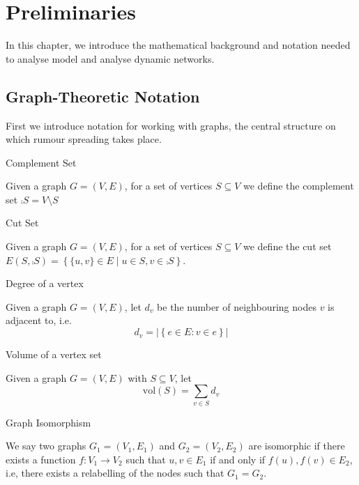 \chapter{Preliminaries}
\label{chapter:Prelims}

In this chapter, we introduce the mathematical background and notation needed to analyse model and analyse dynamic networks.

\section{Graph-Theoretic Notation}\label{section:graphNotation}

First we introduce notation for working with graphs, the central structure on which rumour spreading takes place.

\begin{definition}
	Complement Set

	\noindent
	Given a graph $G = (V, E)$, for a set of vertices $S \subseteq V$ we define the complement set $\comp{S} = V \setminus S$
\end{definition}

\begin{definition}
	Cut Set

	\noindent
	Given a graph $G = (V, E)$, for a set of vertices $S \subseteq V$ we define the cut set $ E(S, \comp{S}) = \left\{\{u, v\} \in E \mid u \in S, v \in \comp{S} \right\}.$
\end{definition}

\begin{definition}
	Degree of a vertex

	\noindent
	Given a graph $G = (V, E)$, let $d_v$ be the number of neighbouring nodes $v$ is adjacent to, i.e. $$
		d_v = |\left\{ e \in E : v \in e \right\}|
	$$
\end{definition}

\begin{definition}
	Volume of a vertex set

	\noindent
	Given a graph $G = (V, E)$ with $S \subseteq V$, let 
	$$
		\text{vol}(S) = \sum_{v \in S} d_v
	$$
\end{definition}

\begin{definition}
	Graph Isomorphism

	\noindent		
	We say two graphs $G_1 = (V_1, E_1)$ and $G_2 = (V_2, E_2)$ are isomorphic if there exists a function $f: V_1 \to V_2$ such that ${u, v} \in E_1$ if and only if ${f(u), f(v)} \in E_2$, i.e, there exists a relabelling of the nodes such that $G_1=G_2$.
\end{definition}

